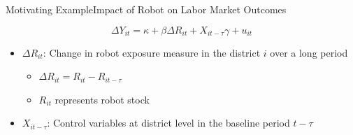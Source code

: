 \documentclass[dvipsnames,hyperref={pdfpagelabels=false}]{beamer}
\begin{document}
	\begin{frame}{Motivating Example}{Impact of Robot on Labor Market Outcomes}


	\begin{equation*}
		\Delta Y_{it} = \kappa + \beta \Delta R_{it} + X_{it-\tau} \gamma  + u_{it}
	\end{equation*}
	\begin{itemize}
		
		\item $\Delta R_{it}$: Change in robot exposure measure in the district $i$ over a long period
			\begin{itemize}
									\vspace{0.2cm}	
	\item 	$\Delta R_{it} = R_{it} - R_{it-\tau}$												\vspace{0.2cm}

\item $R_{it}$ represents robot stock
			\end{itemize}
		
														\vspace{0.2cm}
		\item $X_{it-\tau}$: Control variables at district level in the baseline period $t-\tau$
%		
	\end{itemize}
\end{frame}
\end{document}
